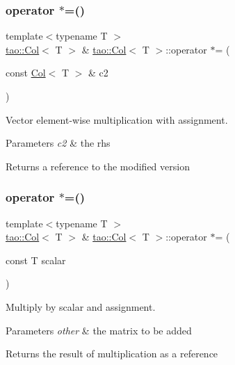 \subsubsection{\texorpdfstring{operator $\ast$=()}{operator *=()}\hspace{0.1cm}{\footnotesize\ttfamily [1/2]}}
{\footnotesize\ttfamily template$<$typename T $>$ \\
\mbox{\hyperlink{classtao_1_1_col}{tao\+::\+Col}}$<$ T $>$ \& \mbox{\hyperlink{classtao_1_1_col}{tao\+::\+Col}}$<$ T $>$\+::operator $\ast$= (\begin{DoxyParamCaption}\item[{const \mbox{\hyperlink{classtao_1_1_col}{Col}}$<$ T $>$ \&}]{c2 }\end{DoxyParamCaption})}



Vector element-\/wise multiplication with assignment. 


\begin{DoxyParams}{Parameters}
{\em c2} & the rhs \\
\hline
\end{DoxyParams}
\begin{DoxyReturn}{Returns}
a reference to the modified version 
\end{DoxyReturn}
\mbox{\label{classtao_1_1_col_a29c998087d6d7b98ecee1ba9fb7237a9}} 
\subsubsection{\texorpdfstring{operator $\ast$=()}{operator *=()}\hspace{0.1cm}{\footnotesize\ttfamily [2/2]}}
{\footnotesize\ttfamily template$<$typename T $>$ \\
\mbox{\hyperlink{classtao_1_1_col}{tao\+::\+Col}}$<$ T $>$ \& \mbox{\hyperlink{classtao_1_1_col}{tao\+::\+Col}}$<$ T $>$\+::operator $\ast$= (\begin{DoxyParamCaption}\item[{const T}]{scalar }\end{DoxyParamCaption})}



Multiply by scalar and assignment. 


\begin{DoxyParams}{Parameters}
{\em other} & the matrix to be added \\
\hline
\end{DoxyParams}
\begin{DoxyReturn}{Returns}
the result of multiplication as a reference 
\end{DoxyReturn}
\mbox{\label{classtao_1_1_col_a7d08ac2d077bed978eb783b5fe707a7c}} 
